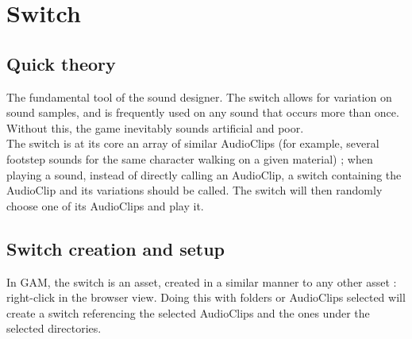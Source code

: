 \documentclass[a4paper,10pt]{article}
\begin{document}


\section{Switch} \label{sec:switch}

\subsection{Quick theory}
The fundamental tool of the sound designer. The switch allows for variation on sound samples, and is frequently used on any sound that occurs more than once. Without this, the game inevitably sounds artificial and poor.\\

The switch is at its core an array of similar AudioClips (for example, several footstep sounds for the same character walking on a given material) ; when playing a sound, instead of directly calling an AudioClip, a switch containing the AudioClip and its variations should be called. The switch will then randomly choose one of its AudioClips and play it.

\subsection{Switch creation and setup}

In GAM, the switch is an asset, created in a similar manner to any other asset : right-click in the browser view. Doing this with folders or AudioClips selected will create a switch referencing the selected AudioClips and the ones under the selected directories. \\
\end{document}
